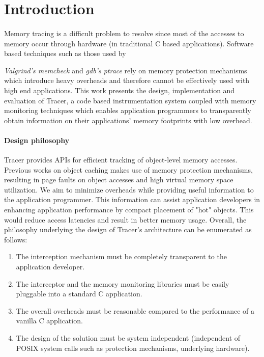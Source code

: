 \section{Introduction} 
\label{sec:intro}
\paragraph{}
Memory tracing is a difficult problem to resolve since most of the accesses to memory occur through hardware (in traditional C based applications). Software based techniques such as those used by {\emph{Valgrind's memcheck \cite{Valgrind}} and {\emph{gdb's ptrace}} rely on memory protection mechanisms which introduce heavy overheads and therefore cannot be effectively used with high end applications. This work presents the design, implementation and evaluation of Tracer, a code based instrumentation system coupled with memory monitoring techniques which enables application programmers to transparently obtain information on their applications' memory footprints with low overhead. 

\paragraph{Design philosophy}
Tracer provides APIs for efficient tracking of object-level memory accesses. Previous works on object caching makes use of memory protection mechanisms, resulting in page faults on object accesses and high virtual memory space utilization. We aim to minimize overheads while providing useful information to the application programmer. This information can assist application developers in enhancing application performance by compact placement of "hot" objects. This would reduce access latencies and result in better memory usage. Overall, the philosophy underlying the design of Tracer's architecture can be enumerated as follows:
\begin{enumerate}
\item The interception mechanism must be completely transparent to the application developer.
\item The interceptor and the memory monitoring libraries must be easily pluggable into a standard C application.
\item The overall overheads must be reasonable compared to the performance of a vanilla C application.
\item The design of the solution must be system independent (independent of POSIX system calls such as protection mechanisms, underlying hardware).
\end{enumerate}

}
